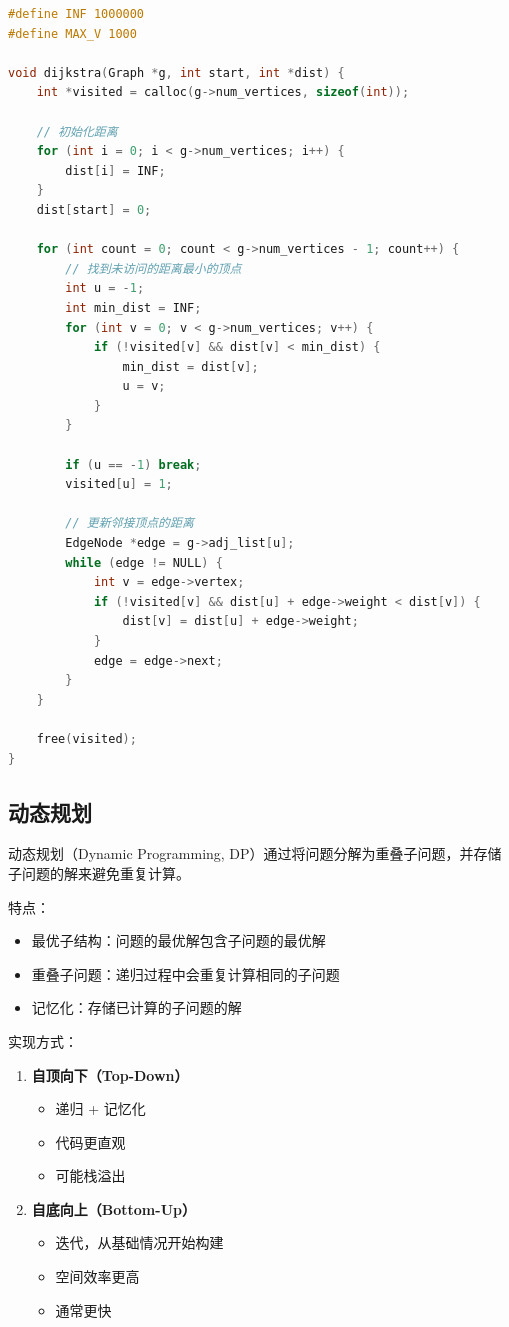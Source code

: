 \begin{lstlisting}[language=C, caption={Dijkstra 最短路径算法}]
#define INF 1000000
#define MAX_V 1000

void dijkstra(Graph *g, int start, int *dist) {
    int *visited = calloc(g->num_vertices, sizeof(int));

    // 初始化距离
    for (int i = 0; i < g->num_vertices; i++) {
        dist[i] = INF;
    }
    dist[start] = 0;

    for (int count = 0; count < g->num_vertices - 1; count++) {
        // 找到未访问的距离最小的顶点
        int u = -1;
        int min_dist = INF;
        for (int v = 0; v < g->num_vertices; v++) {
            if (!visited[v] && dist[v] < min_dist) {
                min_dist = dist[v];
                u = v;
            }
        }

        if (u == -1) break;
        visited[u] = 1;

        // 更新邻接顶点的距离
        EdgeNode *edge = g->adj_list[u];
        while (edge != NULL) {
            int v = edge->vertex;
            if (!visited[v] && dist[u] + edge->weight < dist[v]) {
                dist[v] = dist[u] + edge->weight;
            }
            edge = edge->next;
        }
    }

    free(visited);
}
\end{lstlisting}

\subsection{动态规划}


动态规划（Dynamic Programming, DP）通过将问题分解为重叠子问题，并存储子问题的解来避免重复计算。

特点：
\begin{itemize}
  \item 最优子结构：问题的最优解包含子问题的最优解
  \item 重叠子问题：递归过程中会重复计算相同的子问题
  \item 记忆化：存储已计算的子问题的解
\end{itemize}

实现方式：
\begin{enumerate}
  \item \textbf{自顶向下（Top-Down）}
    \begin{itemize}
      \item 递归 + 记忆化
      \item 代码更直观
      \item 可能栈溢出
    \end{itemize}

  \item \textbf{自底向上（Bottom-Up）}
    \begin{itemize}
      \item 迭代，从基础情况开始构建
      \item 空间效率更高
      \item 通常更快
    \end{itemize}
\end{enumerate}

